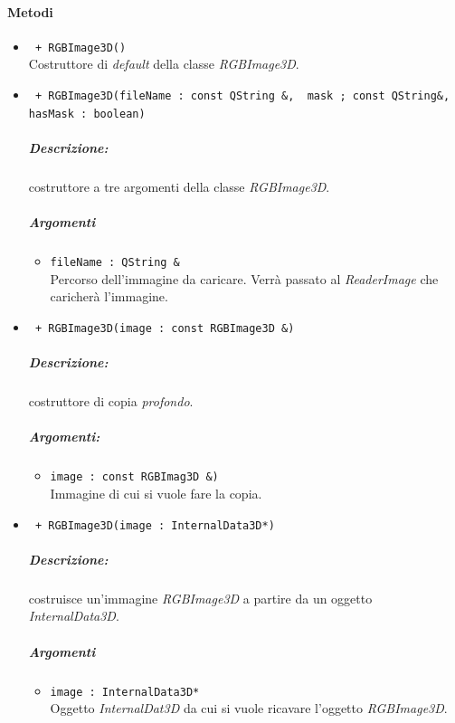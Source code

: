 \paragraph{Metodi }
	\begin{itemize}
		\item \color{blue}\verb! + RGBImage3D()! \\
		\color{black} Costruttore di \emph{default} della classe \textsl{RGBImage3D}.
		
		\item \color{blue}\verb! + RGBImage3D(fileName : const QString &,  mask ; const QString&,!\\
								   \verb!hasMask : boolean)! 
			\color{black} 
			\subparagraph{Descrizione:} costruttore a tre argomenti della classe \textsl{RGBImage3D}.	
			\subparagraph{Argomenti}
			\begin{itemize}
				\item \color{RoyalPurple}\verb!fileName : QString &! \\
				\color{black}Percorso dell'immagine da caricare. Verrà passato al \textit{ReaderImage} che caricherà l'immagine.
			\end{itemize}
			
		\item \color{blue}\verb! + RGBImage3D(image : const RGBImage3D &)!\\
		\color{black}
		\subparagraph{Descrizione:} costruttore di copia \emph{profondo}.
		\subparagraph{Argomenti:}
			\begin{itemize}
				\item \color{RoyalPurple}\verb!image : const RGBImag3D &)!\\
				\color{black}Immagine di cui si vuole fare la copia.
			\end{itemize}
		
		\item \color{blue}\verb! + RGBImage3D(image : InternalData3D*)!\\
		\color{black}
		\subparagraph{Descrizione:} costruisce un'immagine \textsl{RGBImage3D} a partire da un oggetto \textsl{InternalData3D}.
		\subparagraph{Argomenti}
			\begin{itemize}
				\item \color{RoyalPurple}\verb!image : InternalData3D*!\\
				\color{black}Oggetto \textsl{InternalDat3D} da cui si vuole ricavare l'oggetto \textsl{RGBImage3D}.
			\end{itemize}
			

\end{itemize}
